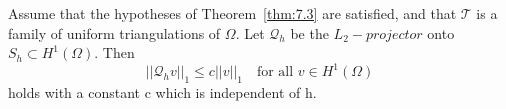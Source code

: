 \begin{corollary}
    Assume that the hypotheses of Theorem~\ref{thm:7.3} are satisfied, and that $\mathcal{T}$ is a family of uniform triangulations of $\Omega$. Let $\mathcal{Q}_h$ be the $L_2-projector$ onto $S_h \subset H^1(\Omega)$. Then
    \begin{equation}
        ||\mathcal{Q}_h v||_1 \leq c||v||_1\quad \text{for all } v\in H^1(\Omega)
    \end{equation}
    holds with a constant c which is independent of h.
\end{corollary}

\begin{bev}
    
\end{bev}